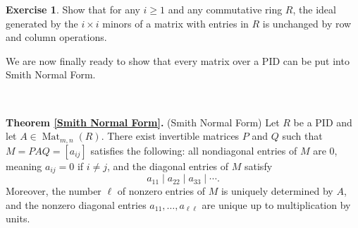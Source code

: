 \documentclass[12pt]{report}
\numberwithin{equation}{section}
\numberwithin{theorem}{chapter}
\theoremstyle{definition}
\newtheorem{exercise}{Exercise}
\newtheorem*{basic properties}{Basic Properties}
\newtheorem*{Important Remark}{Important Remark}
\DeclareMathOperator{\M}{Mat}
\begin{document}
\begin{exercise}\label{exercise minors}
Show that for any $i \geqslant 1$ and any commutative ring $R$, the ideal generated by the $i \times i$ minors of a matrix with entries in $R$ is unchanged by row and column operations.
\end{exercise}


We are now finally ready to show that every matrix over a PID can be put into Smith Normal Form.

\


{\bf Theorem \ref{Smith Normal Form}.} (Smith Normal Form)
 Let $R$ be a PID and let $A \in \M_{m,n}(R)$. There exist invertible matrices $P$ and $Q$ such that $M = PAQ = [a_{ij}]$ satisfies the following: all nondiagonal entries of $M$ are 0, meaning $a_{ij} = 0$ if $i \neq j$, and the diagonal entries of $M$ satisfy 
$$a_{11} \mid a_{22} \mid a_{33} \mid \cdots.$$ 
Moreover, the number $\ell$ of nonzero entries of $M$ is uniquely determined by $A$, and the nonzero diagonal entries $a_{11},\ldots, a_{\ell \ell}$ are unique up to multiplication by units.
\end{document}
